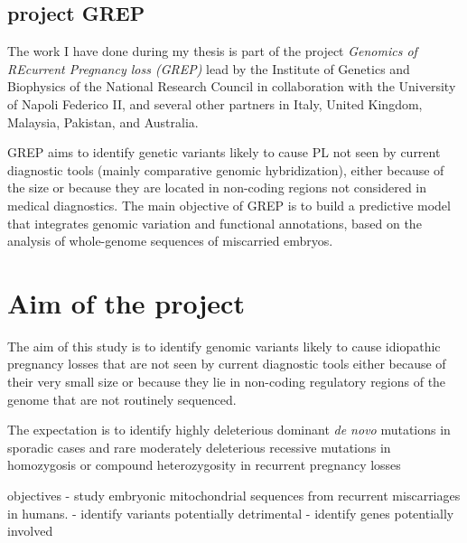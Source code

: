 \section{project GREP}
The work I have done during my thesis is part of the project \textit{Genomics of REcurrent Pregnancy loss (GREP)} lead by the Institute of Genetics and Biophysics of the National Research Council in collaboration with the University of Napoli Federico II, and several other partners in Italy, United Kingdom, Malaysia, Pakistan, and Australia.  

GREP aims to identify genetic variants likely to cause PL not seen by current diagnostic tools (mainly comparative genomic hybridization), either because of the size or because they are located in non-coding regions not considered in medical diagnostics. The main objective of GREP is to build a predictive model that integrates genomic variation and functional annotations, based on the analysis of whole-genome sequences of miscarried embryos.\\

\chapter{Aim of the project }
The aim of this study is to identify genomic variants likely to cause idiopathic pregnancy losses that are not seen by current diagnostic tools either because of their very small size or because they lie in non-coding regulatory regions of the genome that are not routinely sequenced.

The expectation is to identify highly deleterious dominant \textit{de novo} mutations in sporadic cases and rare moderately deleterious recessive mutations in homozygosis or compound heterozygosity in recurrent pregnancy losses 

objectives 
- study embryonic mitochondrial sequences from recurrent miscarriages in humans.
- identify variants potentially detrimental 
- identify genes potentially involved
